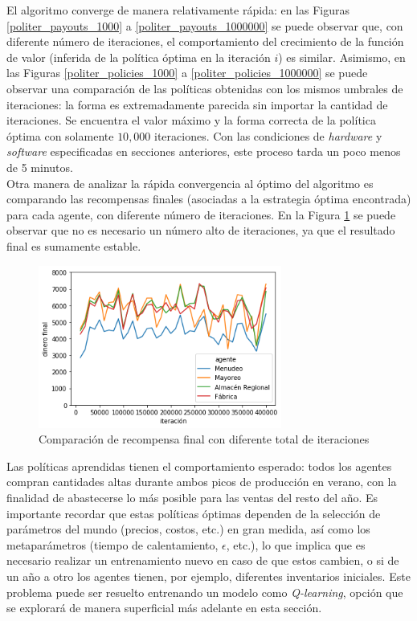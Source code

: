 El algoritmo converge de manera relativamente r\'apida: en las Figuras  \ref{politer_payouts_1000} a \ref{politer_payouts_1000000} se puede observar que, con diferente n\'umero de iteraciones, el comportamiento del crecimiento de la funci\'on de valor (inferida de la pol\'itica \'optima en la iteraci\'on $i$) es similar. Asimismo, en las Figuras \ref{politer_policies_1000} a \ref{politer_policies_1000000} se puede observar una comparaci\'on de las pol\'iticas obtenidas con los mismos umbrales de iteraciones: la forma es extremadamente parecida sin importar la cantidad de iteraciones. Se encuentra el valor m\'aximo y la forma correcta de la pol\'itica \'optima con solamente $10,000$ iteraciones. Con las condiciones de \textit{hardware} y \textit{software} especificadas en secciones anteriores, este proceso tarda un poco menos de 5 minutos.\\

Otra manera de analizar la r\'apida convergencia al \'optimo del algoritmo es comparando las recompensas finales (asociadas a la estrategia \'optima encontrada) para cada agente, con diferente n\'umero de iteraciones. En la Figura \ref{money_over_time} se puede observar que no es necesario un n\'umero alto de iteraciones, ya que el resultado final es sumamente estable.\\

\begin{figure}[H]
\caption{Comparaci\'on de recompensa final con diferente total de iteraciones}
\label{money_over_time}
\includegraphics[width=8cm]{tesis_tex/figs/evaluating_interations_money.png}
\centering
\end{figure}

Las pol\'iticas aprendidas tienen el comportamiento esperado: todos los agentes compran cantidades altas durante ambos picos de producci\'on en verano, con la finalidad de abastecerse lo m\'as posible para las ventas del resto del a\~no. Es importante recordar que estas pol\'iticas \'optimas dependen de la selecci\'on de par\'ametros del mundo (precios, costos, etc.) en gran medida, as\'i como los metapar\'ametros (tiempo de calentamiento, $\epsilon$, etc.), lo que implica que es necesario realizar un entrenamiento nuevo en caso de que estos cambien, o si de un a\~no a otro los agentes tienen, por ejemplo, diferentes inventarios iniciales. Este problema puede ser resuelto entrenando un modelo como \textit{Q-learning}, opci\'on que se explorar\'a de manera superficial m\'as adelante en esta secci\'on.\\

